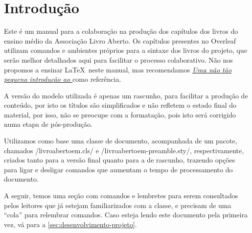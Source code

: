 \section{Introdução}

Este é um manual para a colaboração na produção dos capítulos dos
livros do ensino médio da Associação Livro Aberto. Os capítulos
presentes no Overleaf utilizam comandos e ambientes próprios para a
sintaxe dos livros do projeto, que serão melhor detalhados aqui para
facilitar o processo colaborativo. Não nos propomos a ensinar
\LaTeX~neste manual, mas recomendamos
\emph{\href{http://alfarrabio.di.uminho.pt/~albie/lshort/pt-lshort-a5.pdf}{Uma
		não tão pequena introdução ao \LaTeXe}} como referência.

A versão do modelo utilizada é apenas um rascunho, para facilitar a
produção de conteúdo, por isto os títulos são simplificados e não
refletem o estado final do material, por isso, não se preocupe com a
formatação, pois isto será corrigido numa etapa de pós-produção.

Utilizamos como base uma classe de documento, acompanhada de um pacote,
chamados \latexinline/livroabertoem.cls/ e
\latexinline/livroabertoem-preamble.sty/, respectivamente, criados
tanto para a versão final quanto para a de rascunho, trazendo opções
para ligar e desligar comandos que aumentam o tempo de processamento do
documento.

A seguir, temos uma seção com comandos e lembretes para serem
consultados pelos leitores que já estejam familiarizados com a classe,
e precisam de uma \enquote{cola} para relembrar comandos. Caso esteja
lendo este documento pela primeira vez, vá para a
\cref{sec:desenvolvimento-projeto}.

